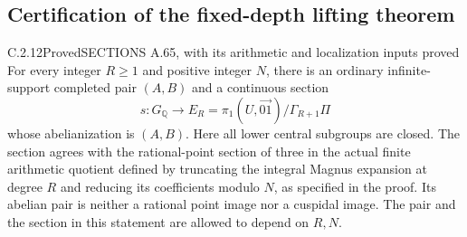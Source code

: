 \subsection{Certification of the fixed-depth lifting theorem}

\begin{result}{C.2.12}{Proved}{SECTIONS A.65, with its arithmetic and localization inputs proved}
\label{thm:ghost-fixed-depth-survival}
For every integer \(R\ge1\) and positive integer \(N\),
there is an ordinary infinite-support completed pair
\((A,B)\) and a continuous section
\[
 s:G_{\mathbb Q}\longrightarrow
 E_R=\pi_1(U,\overrightarrow{01})/\Gamma_{R+1}\Pi
\]
whose abelianization is \((A,B)\). Here all lower
central subgroups are closed. The section agrees with
the rational-point section of three in the actual
finite arithmetic quotient defined by truncating the
integral Magnus expansion at degree \(R\) and
reducing its coefficients modulo \(N\), as specified
in the proof. Its abelian pair is neither a rational
point image nor a cuspidal image. The pair and the
section in this statement are allowed to depend on
\(R,N\).
\end{result}
